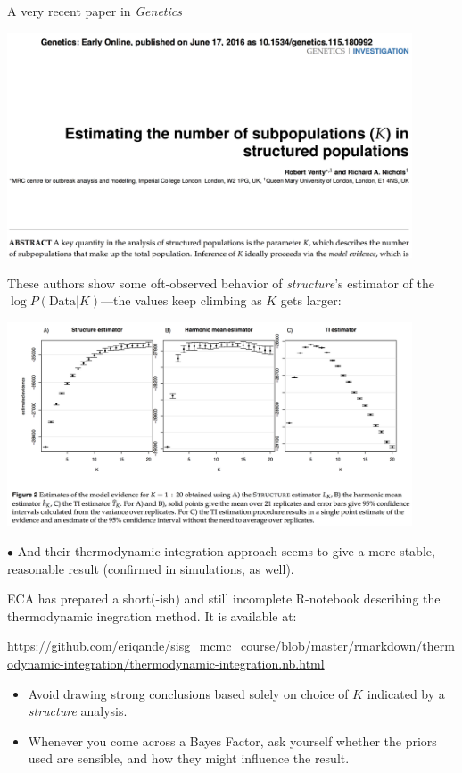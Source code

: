 


A very recent paper in {\em Genetics}
\begin{center}
\includegraphics[width = 0.9\textwidth]{illus/verity.png}
\end{center}
\newpage

These authors show some oft-observed behavior of {\em structure}'s estimator of the $\log P(\mathrm{Data} | K)$---the values keep climbing as $K$ gets larger:
\begin{center}
\includegraphics[width = 0.9\textwidth]{illus/verity2.png}
\end{center}
$\bullet$ And their thermodynamic integration approach seems to give a more stable, reasonable 
result (confirmed in simulations, as well).

\newpage
ECA has prepared a short(-ish) and still incomplete R-notebook describing the thermodynamic inegration method.  It is available at:

{\tiny
\url{https://github.com/eriqande/sisg_mcmc_course/blob/master/rmarkdown/thermodynamic-integration/thermodynamic-integration.nb.html}
}


\begin{itemize}
\item Avoid drawing strong conclusions based solely on
choice of $K$ indicated by a {\sl structure} analysis.
\item Whenever you come across a Bayes Factor, ask yourself whether the priors
used are sensible, and how they might influence the result.
\end{itemize}


